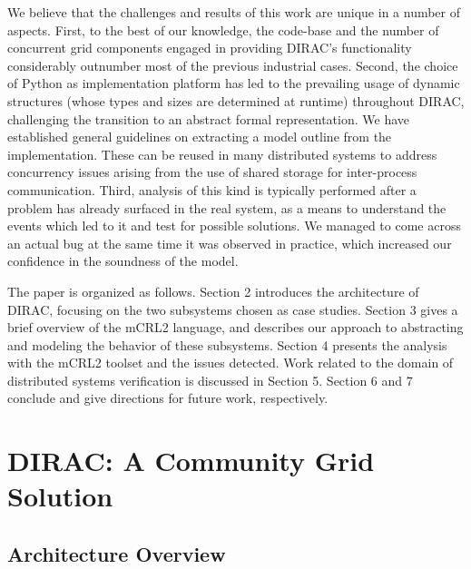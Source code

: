 \documentclass[sort&compress,preprint,3p]{elsarticle}
\begin{document}
We believe that the challenges and results of this work are unique in
a number of aspects. First, to the best of our knowledge, the code-base
and the number of concurrent grid components engaged in providing DIRAC's
functionality considerably outnumber most of the previous industrial cases. Second,
the choice of Python as implementation platform has led to the prevailing
usage of dynamic structures (whose types and sizes are determined at
runtime) throughout DIRAC, challenging the transition to an abstract
formal representation. We have established general
guidelines on extracting a model outline from the implementation. These
can be reused in many distributed systems to address concurrency issues arising 
from the use of shared storage for inter-process communication. Third,
analysis of this kind is typically performed after a problem has already
surfaced in the real system, as a means to understand the events which
led to it and test for possible solutions. We managed to come across an
actual bug at the same time it was observed in practice, which increased
our confidence in the soundness of the model.

The paper is organized as follows. Section 2 introduces the architecture
of DIRAC, focusing on the two subsystems chosen as case studies. Section 3 gives a brief
overview of the mCRL2 language, and describes our approach to abstracting
and modeling the behavior of these subsystems. Section 4 presents the
analysis with the mCRL2 toolset and the issues detected. Work related to the 
domain of distributed systems verification is discussed in Section 5. Section 6 and 7
conclude and give directions for future work, respectively. 

\section{DIRAC: A Community Grid Solution}
\label{sec:Section_2}
\subsection{Architecture Overview}
\end{document}
